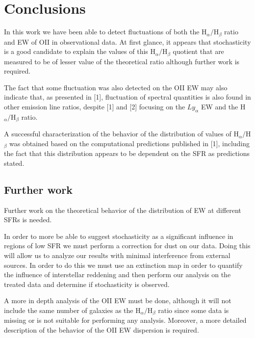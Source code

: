 \chapter{Conclusions}

In this work we have been able to detect fluctuations of both the H$_{\alpha}/$H$_{\beta}$ ratio and EW of OII in observational data. At first
glance, it appears that stochasticity is a good candidate to explain the values of this H$_{\alpha}/$H$_{\beta}$ quotient that are measured to be
of lesser value of the theoretical ratio although further work is required.

The fact that some fluctuation was also detected on the OII EW may also indicate that, as presented in [1], fluctuation of spectral quantities is
also found in other emission line ratios, despite [1] and [2] focusing on the $Ly_{\alpha}$ EW and the H$_{\alpha}/$H$_{\beta}$ ratio.

A successful characterization of the behavior of the distribution of values of H$_{\alpha}/$H$_{\beta}$ was obtained based on the computational
predictions published in [1], including the fact that this distribution appears to be dependent on the SFR as predictions stated.

\section{Further work}

Further work on the theoretical behavior of the distribution of EW at different SFRs is needed.

In order to more be able to suggest stochasticity as a significant influence in regions of low SFR we must perform a correction for dust on our data.
Doing this will allow us to analyze our results with minimal interference from external sources. In order to do this we must use an extinction
map in order to quantify the influence of interstellar reddening and then perform our analysis on the treated data and determine if stochasticity is
observed.

A more in depth analysis of the OII EW must be done, although it will not include the same number of galaxies as the H$_{\alpha}/$H$_{\beta}$ ratio
since some data is missing or is not suitable for performing any analysis. Moreover, a more detailed description of the behavior of the OII EW
dispersion is required.
